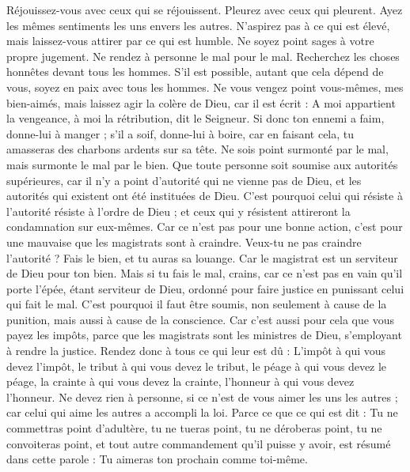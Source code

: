 \begin{multicols}{2}
Réjouissez-vous avec ceux qui se réjouissent. Pleurez avec ceux qui pleurent.
Ayez les mêmes sentiments les uns envers les autres. N’aspirez pas à ce qui est élevé, mais laissez-vous attirer par ce qui est humble. Ne soyez point sages à votre propre jugement.
Ne rendez à personne le mal pour le mal. Recherchez les choses honnêtes devant tous les hommes.
S’il est possible, autant que cela dépend de vous, soyez en paix avec tous les hommes.
Ne vous vengez point vous-mêmes, mes bien-aimés, mais laissez agir la colère de Dieu, car il est écrit : A moi appartient la vengeance, à moi la rétribution, dit le Seigneur.
Si donc ton ennemi a faim, donne-lui à manger ; s'il a soif, donne-lui à boire, car en faisant cela, tu amasseras des charbons ardents sur sa tête.
Ne sois point surmonté par le mal, mais surmonte le mal par le bien.
\VerseOne{}Que toute personne soit soumise aux autorités supérieures, car il n'y a point d’autorité qui ne vienne pas de Dieu, et les autorités qui existent ont été instituées de Dieu.
C'est pourquoi celui qui résiste à l’autorité résiste à l’ordre de Dieu ; et ceux qui y résistent attireront la condamnation sur eux-mêmes.
Car ce n’est pas pour une bonne action, c’est pour une mauvaise que les magistrats sont à craindre. Veux-tu ne pas craindre l’autorité ? Fais le bien, et tu auras sa louange.
Car le magistrat est un serviteur de Dieu pour ton bien. Mais si tu fais le mal, crains, car ce n’est pas en vain qu’il porte l'épée, étant serviteur de Dieu, ordonné pour faire justice en punissant celui qui fait le mal.
C'est pourquoi il faut être soumis, non seulement à cause de la punition, mais aussi à cause de la conscience.
Car c'est aussi pour cela que vous payez les impôts, parce que les magistrats sont les ministres de Dieu, s'employant à rendre la justice.
Rendez donc à tous ce qui leur est dû : L’impôt à qui vous devez l’impôt, le tribut à qui vous devez le tribut, le péage à qui vous devez le péage, la crainte à qui vous devez la crainte, l’honneur à qui vous devez l'honneur.
Ne devez rien à personne, si ce n’est de vous aimer les uns les autres ; car celui qui aime les autres a accompli la loi.
Parce ce que ce qui est dit : Tu ne commettras point d’adultère, tu ne tueras point, tu ne déroberas point, tu ne convoiteras point, et tout autre commandement qu’il puisse y avoir, est résumé dans cette parole : Tu aimeras ton prochain comme toi-même.

\end{multicols}
